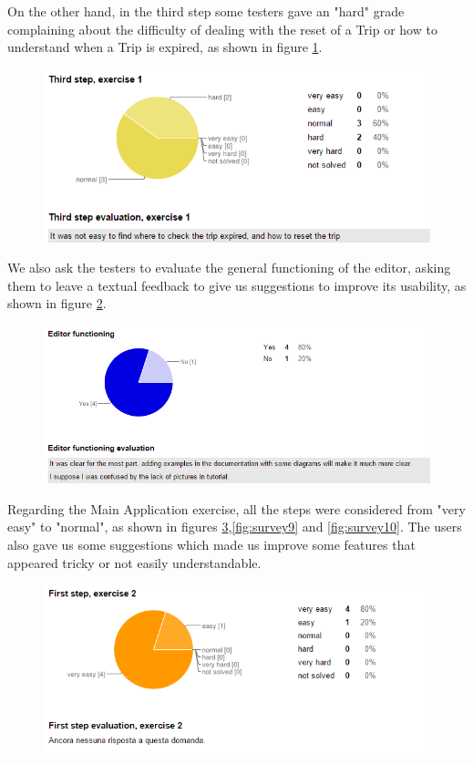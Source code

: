 On the other hand, in the third step some testers gave an "hard" grade complaining about the difficulty of dealing with the reset of a Trip or how to understand when a Trip is expired, as shown in figure \ref{fig:survey4}.

 \begin{figure}[H]
   \centering
   \includegraphics[width=\linewidth]{pictures/survey4.png}
   \label{fig:survey4}
 \end{figure}

We also ask the testers to evaluate the general functioning of the editor, asking them to leave a textual feedback to give us suggestions to improve its usability, as shown in figure \ref{fig:survey1}.

 \begin{figure}[H]
   \centering
   \includegraphics[width=\linewidth]{pictures/survey1.png}
   \label{fig:survey1}
 \end{figure}

Regarding the Main Application exercise, all the steps were considered from "very easy" to "normal", as shown in figures \ref{fig:survey8},\ref{fig:survey9} and \ref{fig:survey10}.
The users also gave us some suggestions which made us improve some features that appeared tricky or not easily understandable.
\\

\begin{figure}[H]
   \centering
   \includegraphics[width=\linewidth]{pictures/survey8.png}
   \label{fig:survey8}
 \end{figure}
 
